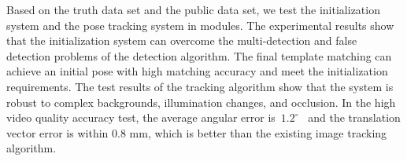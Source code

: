 \begin{eabstract}
  Based on the truth data set and the public data set, we test the initialization system and the pose tracking system in modules. The experimental results show that the initialization system can overcome the multi-detection and false detection problems of the detection algorithm. The final template matching can achieve an initial pose with high matching accuracy and meet the initialization requirements. The test results of the tracking algorithm show that the system is robust to complex backgrounds, illumination changes, and occlusion. In the high video quality accuracy test, the average angular error is~$1.2^\circ$~ and the translation vector error is within 0.8 mm, which is better than the existing image tracking algorithm.
\end{eabstract}

